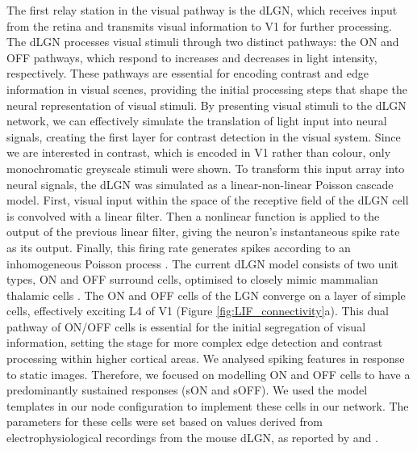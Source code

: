 \documentclass[12pt]{article}
\begin{document}
The first relay station in the visual pathway is the dLGN, which receives input from the retina and transmits visual information to V1 for further processing. The dLGN processes visual stimuli through two distinct pathways: the ON and OFF pathways, which respond to increases and decreases in light intensity, respectively. These pathways are essential for encoding contrast and edge information in visual scenes, providing the initial processing steps that shape the neural representation of visual stimuli. By presenting visual stimuli to the dLGN network, we can effectively simulate the translation of light input into neural signals, creating the first layer for contrast detection in the visual system. Since we are interested in contrast, which is encoded in V1 rather than colour, only monochromatic greyscale stimuli were shown. To transform this input array into neural signals, the dLGN was simulated as a linear-non-linear Poisson cascade model. First, visual input within the space of the receptive field of the dLGN cell is convolved with a linear filter. Then a nonlinear function is applied to the output of the previous linear filter, giving the neuron's instantaneous spike rate as its output. Finally, this firing rate generates spikes according to an inhomogeneous Poisson process \autocite{moskovitzComparisonDeepLearning2018}. The current dLGN model consists of two unit types, ON and OFF surround cells, optimised to closely mimic mammalian thalamic cells \autocite{billehSystematicIntegrationStructural2020}. The ON and OFF cells of the LGN converge on a layer of simple cells, effectively exciting L4 of V1 (Figure \ref{fig:LIF_connectivity}a). This dual pathway of ON/OFF cells is essential for the initial segregation of visual information, setting the stage for more complex edge detection and contrast processing within higher cortical areas. We analysed spiking features in response to static images. Therefore, we focused on modelling ON and OFF cells to have a predominantly sustained responses (sON and sOFF). We used the model templates in our node configuration to implement these cells in our network. The parameters for these cells were set based on values derived from electrophysiological recordings from the mouse dLGN, as reported by \textcite{durandComparisonVisualResponse2016} and \textcite{billehSystematicIntegrationStructural2020}.
\end{document}
